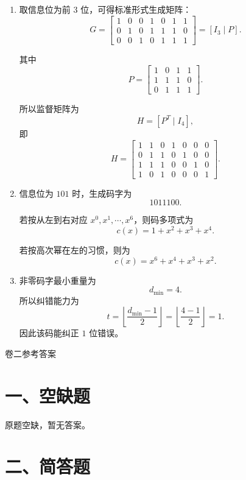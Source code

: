 \documentclass[UTF8,a4paper,12pt]{ctexart}
\begin{document}
\begin{enumerate}[label=\arabic*., leftmargin=2em]
\item 取信息位为前 $3$ 位，可得标准形式生成矩阵：
\[
G=
\begin{bmatrix}
1&0&0&1&0&1&1\\
0&1&0&1&1&1&0\\
0&0&1&0&1&1&1
\end{bmatrix}
=\left[I_3\mid P\right].
\]

其中
\[
P=
\begin{bmatrix}
1&0&1&1\\
1&1&1&0\\
0&1&1&1
\end{bmatrix}.
\]

所以监督矩阵为
\[
H=\left[P^T\mid I_4\right],
\]
即
\[
H=
\begin{bmatrix}
1&1&0&1&0&0&0\\
0&1&1&0&1&0&0\\
1&1&1&0&0&1&0\\
1&0&1&0&0&0&1
\end{bmatrix}.
\]

\item 信息位为 $101$ 时，生成码字为
\[
1011100.
\]

若按从左到右对应 $x^0,x^1,\cdots,x^6$，则码多项式为
\[
c(x)=1+x^2+x^3+x^4.
\]

若按高次幂在左的习惯，则为
\[
c(x)=x^6+x^4+x^3+x^2.
\]

\item 非零码字最小重量为
\[
d_{\min}=4.
\]
所以纠错能力为
\[
t=\left\lfloor\frac{d_{\min}-1}{2}\right\rfloor
=\left\lfloor\frac{4-1}{2}\right\rfloor=1.
\]
因此该码能纠正 $1$ 位错误。
\end{enumerate}



\newpage

\begin{center}
{\heiti{} 卷二参考答案}
\end{center}

\section*{一、空缺题}

原题空缺，暂无答案。

\section*{二、简答题}
\end{document}
